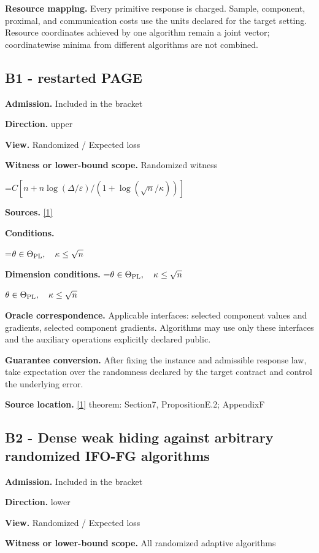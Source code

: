 \documentclass[10pt,a4paper]{article}
\newcommand{\AtlasMath}[1]{\par\begingroup\centering\setbox0=\hbox{$\displaystyle #1$}\ifdim\wd0>1.4\linewidth\typeout{ATLAS WIDE FORMULA: \the\wd0}\fi\ifdim\wd0>\linewidth\resizebox{\linewidth}{!}{\box0}\else\box0\fi\par\endgroup}
\newcommand{\AtlasInlineMath}[1]{\begingroup\setbox0=\hbox{$#1$}\ifdim\wd0>.4\linewidth\endgroup\AtlasMath{#1}\else\endgroup$#1$\fi}
\begin{document}
\textbf{Resource mapping.} Every primitive response is charged. Sample, component, proximal, and communication costs use the units declared for the target setting. Resource coordinates achieved by one algorithm remain a joint vector; coordinatewise minima from different algorithms are not combined.

\subsection{B1 - restarted PAGE}
\textbf{Admission.} Included in the bracket

\textbf{Direction.} upper

\textbf{View.} Randomized / Expected loss

\textbf{Witness or lower-bound scope.} Randomized witness

\AtlasMath{C[n+n\log(\Delta/\varepsilon)/(1+\log(\sqrt n/\kappa))]}
\textbf{Sources.} \href{https://arxiv.org/pdf/2609.00045v3}{[1]}

\textbf{Conditions.} 
\AtlasMath{\theta\in\Theta_{\rm PL},\quad\kappa\le\sqrt n}


\textbf{Dimension conditions.} \AtlasInlineMath{\theta\in\Theta_{\rm PL},\quad\kappa\le\sqrt n}

\textbf{Oracle correspondence.} Applicable interfaces: selected component values and gradients, selected component gradients. Algorithms may use only these interfaces and the auxiliary operations explicitly declared public.

\textbf{Guarantee conversion.} After fixing the instance and admissible response law, take expectation over the randomness declared by the target contract and control the underlying error.

\textbf{Source location.} \href{https://arxiv.org/pdf/2609.00045v3}{[1]} theorem: Section7, PropositionE.2; AppendixF

\subsection{B2 - Dense weak hiding against arbitrary randomized IFO-FG algorithms}
\textbf{Admission.} Included in the bracket

\textbf{Direction.} lower

\textbf{View.} Randomized / Expected loss

\textbf{Witness or lower-bound scope.} All randomized adaptive algorithms
\end{document}
